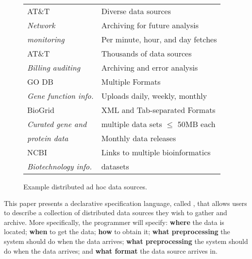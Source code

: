 \begin{figure}[t]
\begin{center}
\begin{tabular}{|l|l|}
{\small AT\&T \darkstar{}                   } & {\small  Diverse data sources} \\
{\small {\em  Network}       } & {\small  Archiving for future analysis } \\
{\small {\em  monitoring}	} & {\small  Per minute, hour, and day fetches} \\\hline
{\small AT\&T \ningaui{}                    } & {\small  Thousands of data sources} \\
{\small {\em  Billing auditing}        } & {\small  Archiving and error analysis} \\\hline
{\small GO DB~\cite{geneontology} } & {\small  Multiple Formats } \\
{\small {\em  Gene function info.}     } & {\small  Uploads daily, weekly, monthly } \\\hline
{\small BioGrid~\cite{biogrid}        } & {\small  XML and Tab-separated Formats } \\
{\small {\em  Curated gene and}  } & {\small  multiple data sets $\leq$ 50MB each } \\
{\small {\em  protein data}                              } & {\small  Monthly data releases } \\\hline
{\small NCBI~\cite{ncbi} } & {\small  Links to multiple bioinformatics  } \\
{\small {\em  Biotechnology info.} } & {\small  datasets} \\
\hline
\end{tabular}
\end{center}
\shrink 
\caption{Example distributed ad hoc data sources.}
\shrink 
\label{fig:exampledata}
\end{figure}

This paper presents a declarative specification language, called
\padsd{}, that allows users to
describe a collection of distributed data sources they wish to
gather and archive.  More specifically, the \padsd{} programmer will
specify: {\bf where} the data is located; {\bf when} to get the data;      
{\bf how} to obtain it; {\bf what preprocessing} the system should do when the data arrives;
{\bf what preprocessing} the system should do when the data arrives; and 
{\bf what format} the data source arrives in.


